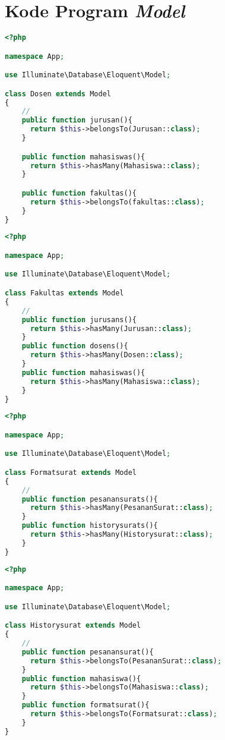 \chapter{Kode Program \textit{Model}}
\label{lamp:C}

\begin{lstlisting}[language=php, caption=Dosen.php]
<?php

namespace App;

use Illuminate\Database\Eloquent\Model;

class Dosen extends Model
{
    //
    public function jurusan(){
      return $this->belongsTo(Jurusan::class);
    }

    public function mahasiswas(){
      return $this->hasMany(Mahasiswa::class);
    }

    public function fakultas(){
      return $this->belongsTo(fakultas::class);
    }
}

\end{lstlisting}

\begin{lstlisting}[language=php, caption=Fakultas.php]
	<?php

namespace App;

use Illuminate\Database\Eloquent\Model;

class Fakultas extends Model
{
    //
    public function jurusans(){
      return $this->hasMany(Jurusan::class);
    }
    public function dosens(){
      return $this->hasMany(Dosen::class);
    }
    public function mahasiswas(){
      return $this->hasMany(Mahasiswa::class);
    }
}

\end{lstlisting}

\begin{lstlisting}[language=php, caption=Formatsurat.php]
	<?php

namespace App;

use Illuminate\Database\Eloquent\Model;

class Formatsurat extends Model
{
    //
    public function pesanansurats(){
      return $this->hasMany(PesananSurat::class);
    }
    public function historysurats(){
      return $this->hasMany(Historysurat::class);
    }
}

\end{lstlisting}

\begin{lstlisting}[language=php, caption=Historysurat.php]
	<?php

namespace App;

use Illuminate\Database\Eloquent\Model;

class Historysurat extends Model
{
    //
    public function pesanansurat(){
      return $this->belongsTo(PesananSurat::class);
    }
    public function mahasiswa(){
      return $this->belongsTo(Mahasiswa::class);
    }
    public function formatsurat(){
      return $this->belongsTo(Formatsurat::class);
    }
}

\end{lstlisting}

